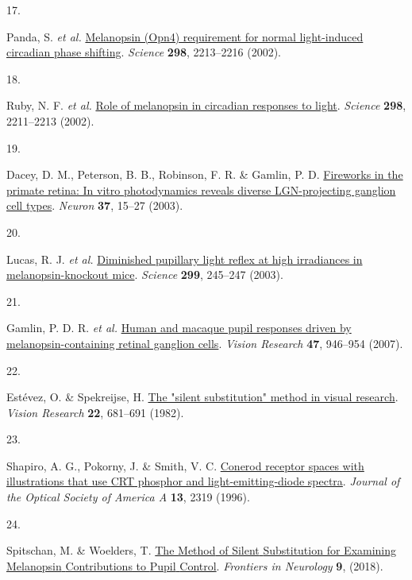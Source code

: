 \documentclass[
]{article}
\newlength{\cslhangindent}
\newlength{\csllabelwidth}
\newenvironment{CSLReferences}[2] %
 {\begin{list}{}{%
  \setlength{\itemindent}{0pt}
  \setlength{\leftmargin}{0pt}
  \setlength{\parsep}{0pt}
  \ifodd #1
   \setlength{\leftmargin}{\cslhangindent}
   \setlength{\itemindent}{-1\cslhangindent}
  \fi
  \setlength{\itemsep}{#2\baselineskip}}}
 {\end{list}}
\newcommand{\CSLLeftMargin}[1]{\parbox[t]{\csllabelwidth}{\strut#1\strut}}
\newcommand{\CSLRightInline}[1]{\parbox[t]{\linewidth - \csllabelwidth}{\strut#1\strut}}
\begin{document}
\begin{CSLReferences}{0}{0}
\CSLLeftMargin{17. }%
\CSLRightInline{Panda, S. \emph{et al.} \href{https://doi.org/10.1126/science.1076848}{Melanopsin (Opn4) requirement for normal light-induced circadian phase shifting}. \emph{Science} \textbf{298}, 2213--2216 (2002).}

\CSLLeftMargin{18. }%
\CSLRightInline{Ruby, N. F. \emph{et al.} \href{https://doi.org/10.1126/science.1076701}{Role of melanopsin in circadian responses to light}. \emph{Science} \textbf{298}, 2211--2213 (2002).}

\CSLLeftMargin{19. }%
\CSLRightInline{Dacey, D. M., Peterson, B. B., Robinson, F. R. \& Gamlin, P. D. \href{https://doi.org/10.1016/S0896-6273(02)01143-1}{Fireworks in the primate retina: In vitro photodynamics reveals diverse LGN-projecting ganglion cell types}. \emph{Neuron} \textbf{37}, 15--27 (2003).}

\CSLLeftMargin{20. }%
\CSLRightInline{Lucas, R. J. \emph{et al.} \href{https://doi.org/10.1126/science.1077293}{Diminished pupillary light reflex at high irradiances in melanopsin-knockout mice}. \emph{Science} \textbf{299}, 245--247 (2003).}

\CSLLeftMargin{21. }%
\CSLRightInline{Gamlin, P. D. R. \emph{et al.} \href{https://doi.org/10.1016/j.visres.2006.12.015}{Human and macaque pupil responses driven by melanopsin-containing retinal ganglion cells}. \emph{Vision Research} \textbf{47}, 946--954 (2007).}

\CSLLeftMargin{22. }%
\CSLRightInline{Estévez, O. \& Spekreijse, H. \href{https://doi.org/10.1016/0042-6989(82)90104-3}{The "silent substitution" method in visual research}. \emph{Vision Research} \textbf{22}, 681--691 (1982).}

\CSLLeftMargin{23. }%
\CSLRightInline{Shapiro, A. G., Pokorny, J. \& Smith, V. C. \href{https://doi.org/10.1364/josaa.13.002319}{Cone{\textendash}rod receptor spaces with illustrations that use {CRT} phosphor and light-emitting-diode spectra}. \emph{Journal of the Optical Society of America A} \textbf{13}, 2319 (1996).}

\CSLLeftMargin{24. }%
\CSLRightInline{Spitschan, M. \& Woelders, T. \href{https://doi.org/10.3389/fneur.2018.00941}{The {Method} of {Silent} {Substitution} for {Examining} {Melanopsin} {Contributions} to {Pupil} {Control}}. \emph{Frontiers in Neurology} \textbf{9}, (2018).}


\end{CSLReferences}
\end{document}

